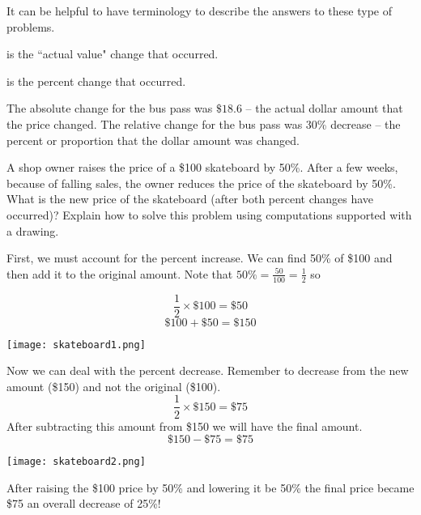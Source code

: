\documentclass{ximera}
\begin{document}
It can be helpful to have terminology to describe the answers to these type of problems.

\begin{definition}

 is the ``actual value" change that occurred. 

 is the percent change that occurred.  
\end{definition}

The absolute change for the bus pass was $\$18.6$ -- the actual dollar amount that the price changed. The relative change for the bus pass was 30\% decrease -- the percent or proportion that the dollar amount was changed.

\begin{example}
A shop owner raises the price of a \$100 skateboard by 50\%. After a few weeks, because of falling sales, the owner reduces the price of the skateboard by 50\%.
What is the new price of the skateboard (after both percent changes have occurred)? Explain how to solve this problem using computations supported with a drawing.

\begin{explanation}
  First, we must account for the percent increase. We can find 50\% of \$100 and then add it to the original amount.  Note that $50\%=\frac{50}{100}=\frac{1}{2}$ so 

$$
\frac{1}{2} \times \$100 = \$50
$$
$$
\$ 100 + \$50 = \$ 150
$$

\begin{image}
    \texttt{[image: skateboard1.png]}
\end{image}

Now we can deal with the percent decrease. Remember to decrease from the new amount (\$150) and not the original (\$100).
$$
\frac{1}{2} \times \$150 = \$75
$$
After subtracting this amount from \$150 we will have the final amount.
$$
\$ 150 - \$75 = \$ 75
$$

\begin{image}
    \texttt{[image: skateboard2.png]}
\end{image}



After raising the \$100 price by 50\% and lowering it be 50\% the final price became \$75 an overall decrease of 25\%!
\end{explanation}
\end{example}
\end{document}
